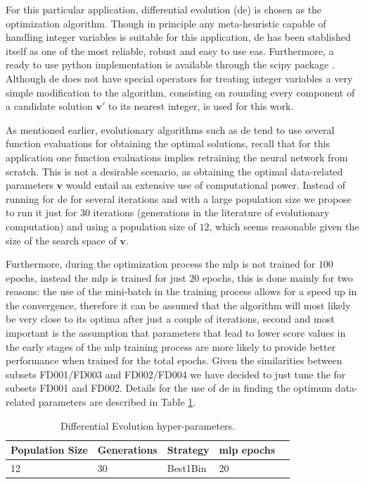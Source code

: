 \documentclass{article}
\begin{document}
For this particular application, differential evolution (\gls{de}) \cite{Storn1997} is chosen as the optimization algorithm. Though in principle any meta-heuristic capable of handling integer variables is suitable for this application, \gls{de} has been stablished itself as one of the most reliable, robust and easy to use \glspl{ea}. Furthermore, a ready to use python implementation is available through the scipy package \cite{scipy}. Although \gls{de} does not have special operators for treating integer variables a very simple modification to the algorithm, consisting on rounding every component of a candidate solution $\mathbf{v}'$ to its nearest integer, is used for this work.

As mentioned earlier, evolutionary algorithms such as \gls{de} tend to use several function evaluations for obtaining the optimal solutions, recall that for this application one function evaluations implies retraining the  neural network from scratch. This is not a desirable scenario, as obtaining the optimal data-related parameters $\mathbf{v}$ would entail an extensive use of computational power. Instead of running for \gls{de} for several iterations and with a large population size we propose to run it just for $30$ iterations (generations in the literature of evolutionary computation) and using a population size of $12$, which seems reasonable given the size of the search space of $\mathbf{v}$. 

Furthermore, during the optimization process the \gls{mlp} is not trained for  $100$ epochs, instead the \gls{mlp} is trained for just $20$ epochs, this is done mainly for two reasons: the use of the mini-batch in the training process allows for a speed up in the convergence, therefore it can be assumed that the algorithm will most likely be very close to its optima after just a couple of iterations, second and most important is the assumption that parameters that lead to lower score values in the early stages of the \gls{mlp} training process are more likely to provide better performance when trained for the total epochs. Given the similarities between subsets FD001/FD003 and FD002/FD004 we have decided to just tune the for subsets FD001 and FD002. Details for the use of \gls{de} in finding the optimum data-related parameters are described in Table \ref{table:de_hyperparams}.

\begin{table}[!htb]
\centering
\begin{tabular}{l l l l l}
	\hline
	 Population Size & Generations & Strategy & \gls{mlp} epochs\\
  	\hline
  	12 & 30 & Best1Bin & 20\\
  	\hline
\end{tabular}
\caption{Differential Evolution hyper-parameters.}
\label{table:de_hyperparams}
\end{table}
\end{document}
